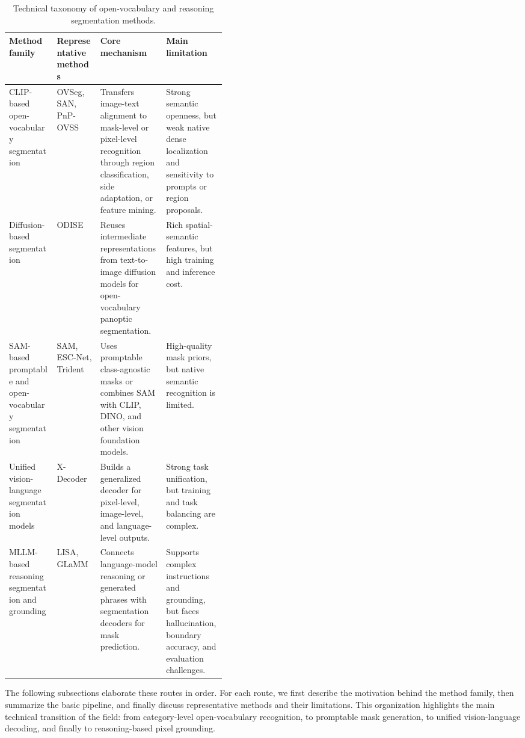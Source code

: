 \begin{table}[!htbp]
\centering
\footnotesize
\caption{Technical taxonomy of open-vocabulary and reasoning segmentation methods.}
\label{tab:method_taxonomy}
\begin{tabularx}{\linewidth}{p{0.22\linewidth} p{0.20\linewidth} X X}
\hline
\textbf{Method family} & \textbf{Representative methods} & \textbf{Core mechanism} & \textbf{Main limitation} \\
\hline

CLIP-based open-vocabulary segmentation 
& OVSeg, SAN, PnP-OVSS 
& Transfers image-text alignment to mask-level or pixel-level recognition through region classification, side adaptation, or feature mining. 
& Strong semantic openness, but weak native dense localization and sensitivity to prompts or region proposals. \\

Diffusion-based segmentation 
& ODISE 
& Reuses intermediate representations from text-to-image diffusion models for open-vocabulary panoptic segmentation. 
& Rich spatial-semantic features, but high training and inference cost. \\

SAM-based promptable and open-vocabulary segmentation 
& SAM, ESC-Net, Trident 
& Uses promptable class-agnostic masks or combines SAM with CLIP, DINO, and other vision foundation models. 
& High-quality mask priors, but native semantic recognition is limited. \\

Unified vision-language segmentation models 
& X-Decoder 
& Builds a generalized decoder for pixel-level, image-level, and language-level outputs. 
& Strong task unification, but training and task balancing are complex. \\

MLLM-based reasoning segmentation and grounding 
& LISA, GLaMM 
& Connects language-model reasoning or generated phrases with segmentation decoders for mask prediction. 
& Supports complex instructions and grounding, but faces hallucination, boundary accuracy, and evaluation challenges. \\

\hline
\end{tabularx}
\end{table}

The following subsections elaborate these routes in order. 
For each route, we first describe the motivation behind the method family, then summarize the basic pipeline, and finally discuss representative methods and their limitations. 
This organization highlights the main technical transition of the field: from category-level open-vocabulary recognition, to promptable mask generation, to unified vision-language decoding, and finally to reasoning-based pixel grounding.

